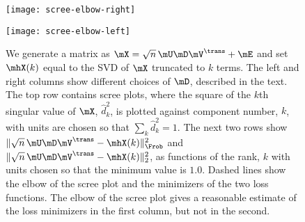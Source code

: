 \begin{figure}[ht]
    \begin{center}
        \begin{minipage}{0.49\textwidth}
            \begin{center}
                \texttt{[image: scree-elbow-right]}
            \end{center}
        \end{minipage}
        \begin{minipage}{0.49\textwidth}
            \begin{center}
                \texttt{[image: scree-elbow-left]}
            \end{center}
        \end{minipage}
        \caption{
            We generate a matrix as
            $\mX = \sqrt{n} \, \mU \mD \mV^\trans + \mE$
            and set $\mhX(k)$ equal to the SVD of $\mX$ truncated to $k$ 
            terms.  The left and right columns show different choices of
            $\mD$, described in the text.  The top row contains scree plots, 
            where the square of the $k$th singular value of $\mX$,
            $\hat d_k^2$, is plotted against 
            component number, $k$, with units are chosen so that 
            $\sum_{k} \hat d_k^2 = 1$.  The next two rows show
            $\| \sqrt{n} \, \mU \mD \mV^\trans - \mhX(k) \|_\Frob^2$ and
            $\| \sqrt{n} \, \mU \mD \mV^\trans - \mhX(k) \|_2^2$, as functions
            of the rank, $k$ with units chosen so that the minimum value is
            $1.0$.  Dashed lines show the elbow of the scree plot and the
            minimizers of the two loss functions.  
            The elbow of the scree plot gives a reasonable estimate of
            the loss minimizers in the first column, but not in the second.
        }\label{F:scree-elbow}
    \end{center}
\end{figure}
